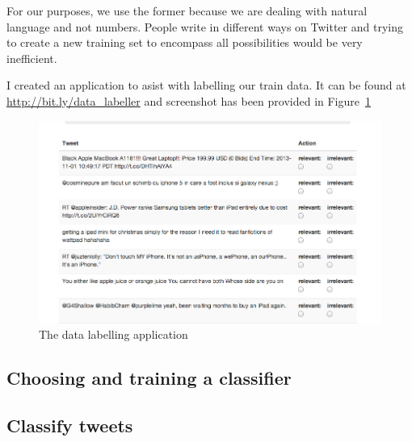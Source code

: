 For our purposes, we use the former because we are dealing with natural language and not numbers.
People write in different ways on Twitter and trying to create a new training set to encompass all
possibilities would be very inefficient.

I created an application to asist with labelling our train data. It can be found at
\url{http://bit.ly/data\_labeller} and screenshot has been provided in Figure~\ref{fig:labeller}

\begin{figure}
  \begin{center}
    \includegraphics[scale=0.4]{Figures/datalabeller}
  \end{center}
  \caption{The data labelling application}
\label{fig:labeller}
\end{figure}


\subsection{Choosing and training a classifier}

\subsection{Classify tweets}
